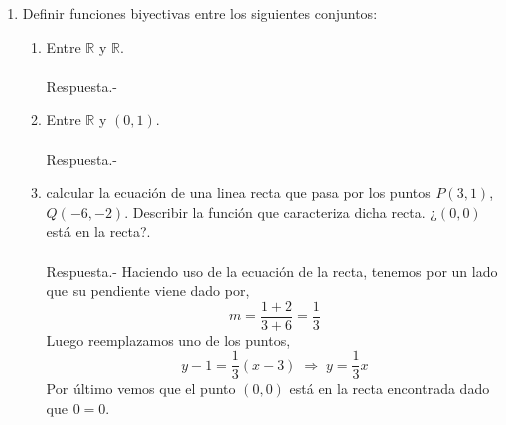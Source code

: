 \begin{enumerate}[\bfseries 1.]
    \item  Definir funciones biyectivas entre los siguientes conjuntos:\\

	\begin{enumerate}[\bfseries a)]

	    \item Entre $\mathbb{R}$ y $\mathbb{R}.$\\\\
		Respuesta.-\; 

	    \item Entre $\mathbb{R}$ y $(0,1).$\\\\
		Respuesta.-\;


    \item calcular la ecuación de una linea recta que pasa por los puntos $P(3,1)$, $Q(-6,-2)$. Describir la función que caracteriza dicha recta. ¿$(0,0)$ está en la recta?.\\\\
	Respuesta.-\; Haciendo uso de la ecuación de la recta, tenemos por un lado que su pendiente viene dado por,
	$$m=\dfrac{1+2}{3+6} = \dfrac{1}{3}$$
	Luego reemplazamos uno de los puntos, 
	$$y-1 = \dfrac{1}{3}(x-3) \; \Longrightarrow \; y = \dfrac{1}{3}x$$
	Por último vemos que el punto $(0,0)$  está en la recta encontrada dado que $0=0$.\\\\




	\end{enumerate}






\end{enumerate}


